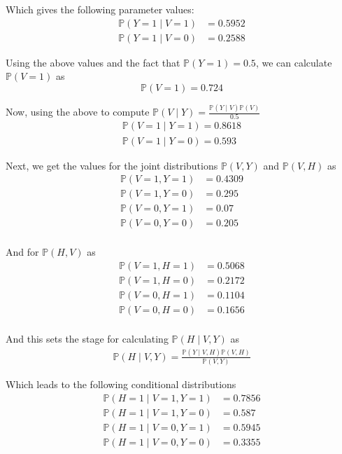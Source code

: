 \documentclass{article}
\begin{document}
Which gives the following parameter values:
\begin{align*}
\mathbb{P}(Y = 1 \mid V = 1) &= 0.5952\\
\mathbb{P}(Y = 1 \mid V = 0) &= 0.2588
\end{align*}

Using the above values and the fact that $\mathbb{P}(Y   = 1) = 0.5$, we can calculate $\mathbb{P}(V = 1)$ as 
\begin{equation*}
\mathbb{P}(V = 1) = 0.724
\end{equation*}

Now, using the above to compute $\mathbb{P}(V \mid Y) = \frac{\mathbb{P}(Y \mid V)\mathbb{P}(V)}{0.5}$
\begin{align*}
\mathbb{P}(V = 1 \mid Y = 1) = 0.8618\\
\mathbb{P}(V = 1 \mid Y = 0) = 0.593
\end{align*}

Next, we get the values for the joint distributions $\mathbb{P}(V, Y)$ and $\mathbb{P}(V, H)$ as
\begin{align*}
\mathbb{P}(V = 1, Y = 1) &= 0.4309\\
\mathbb{P}(V = 1, Y = 0) &= 0.295\\
\mathbb{P}(V = 0, Y = 1) &= 0.07\\
\mathbb{P}(V = 0, Y = 0) &= 0.205\\
\end{align*}

And for $\mathbb{P}(H, V)$ as 
\begin{align*}
\mathbb{P}(V = 1, H = 1) &= 0.5068\\
\mathbb{P}(V = 1, H = 0) &= 0.2172\\
\mathbb{P}(V = 0, H = 1) &= 0.1104\\
\mathbb{P}(V = 0, H = 0) &= 0.1656\\
\end{align*}

And this sets the stage for calculating $\mathbb{P}(H \mid V, Y)$ as
\begin{align*}
\mathbb{P}(H \mid V, Y) = \frac{\mathbb{P}(Y \mid V, H)\mathbb{P}(V, H)}{\mathbb{P}(V, Y)}
\end{align*}

Which leads to the following conditional distributions
\begin{align*}
\mathbb{P}(H = 1 \mid V = 1, Y = 1) &= 0.7856\\
\mathbb{P}(H = 1 \mid V = 1, Y = 0) &= 0.587\\
\mathbb{P}(H = 1 \mid V = 0, Y = 1) &= 0.5945\\
\mathbb{P}(H = 1 \mid V = 0, Y = 0) &= 0.3355\\
\end{align*}
\end{document}
